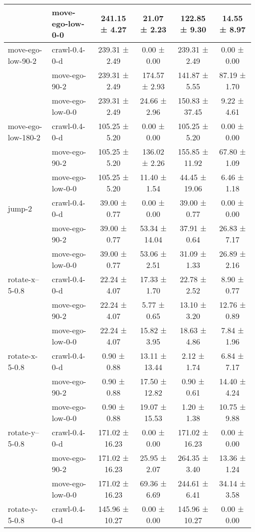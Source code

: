 \begin{tabular}{|l|l|c|c|c|c|}
\hline
 & move-ego-low-0-0 & 241.15 ± 4.27 & 21.07 ± 2.23 & 122.85 ± 9.30 & 14.55 ± 8.97 \\
\hline
move-ego-low-90-2 & crawl-0.4-0-d & 239.31 ± 2.49 & 0.00 ± 0.00 & 239.31 ± 2.49 & 0.00 ± 0.00 \\
\hline
 & move-ego-90-2 & 239.31 ± 2.49 & 174.57 ± 2.93 & 141.87 ± 5.55 & 87.19 ± 1.70 \\
\hline
 & move-ego-low-0-0 & 239.31 ± 2.49 & 24.66 ± 2.96 & 150.83 ± 37.45 & 9.22 ± 4.61 \\
\hline
move-ego-low-180-2 & crawl-0.4-0-d & 105.25 ± 5.20 & 0.00 ± 0.00 & 105.25 ± 5.20 & 0.00 ± 0.00 \\
\hline
 & move-ego-90-2 & 105.25 ± 5.20 & 136.02 ± 2.26 & 155.85 ± 11.92 & 67.80 ± 1.09 \\
\hline
 & move-ego-low-0-0 & 105.25 ± 5.20 & 11.40 ± 1.54 & 44.45 ± 19.06 & 6.46 ± 1.18 \\
\hline
jump-2 & crawl-0.4-0-d & 39.00 ± 0.77 & 0.00 ± 0.00 & 39.00 ± 0.77 & 0.00 ± 0.00 \\
\hline
 & move-ego-90-2 & 39.00 ± 0.77 & 53.34 ± 14.04 & 37.91 ± 0.64 & 26.83 ± 7.17 \\
\hline
 & move-ego-low-0-0 & 39.00 ± 0.77 & 53.06 ± 2.51 & 31.09 ± 1.33 & 26.89 ± 2.16 \\
\hline
rotate-x--5-0.8 & crawl-0.4-0-d & 22.24 ± 4.07 & 17.33 ± 1.70 & 22.78 ± 2.52 & 8.90 ± 0.77 \\
\hline
 & move-ego-90-2 & 22.24 ± 4.07 & 5.77 ± 0.65 & 13.10 ± 3.20 & 12.76 ± 0.89 \\
\hline
 & move-ego-low-0-0 & 22.24 ± 4.07 & 15.82 ± 3.95 & 18.63 ± 4.86 & 7.84 ± 1.96 \\
\hline
rotate-x-5-0.8 & crawl-0.4-0-d & 0.90 ± 0.88 & 13.11 ± 13.44 & 2.12 ± 1.74 & 6.84 ± 7.17 \\
\hline
 & move-ego-90-2 & 0.90 ± 0.88 & 17.50 ± 12.82 & 0.90 ± 0.61 & 14.40 ± 4.24 \\
\hline
 & move-ego-low-0-0 & 0.90 ± 0.88 & 19.07 ± 15.53 & 1.20 ± 1.38 & 10.75 ± 9.88 \\
\hline
rotate-y--5-0.8 & crawl-0.4-0-d & 171.02 ± 16.23 & 0.00 ± 0.00 & 171.02 ± 16.23 & 0.00 ± 0.00 \\
\hline
 & move-ego-90-2 & 171.02 ± 16.23 & 25.95 ± 2.07 & 264.35 ± 3.40 & 13.36 ± 1.24 \\
\hline
 & move-ego-low-0-0 & 171.02 ± 16.23 & 69.36 ± 6.69 & 244.61 ± 6.41 & 34.14 ± 3.58 \\
\hline
rotate-y-5-0.8 & crawl-0.4-0-d & 145.96 ± 10.27 & 0.00 ± 0.00 & 145.96 ± 10.27 & 0.00 ± 0.00 \\

\end{tabular}
